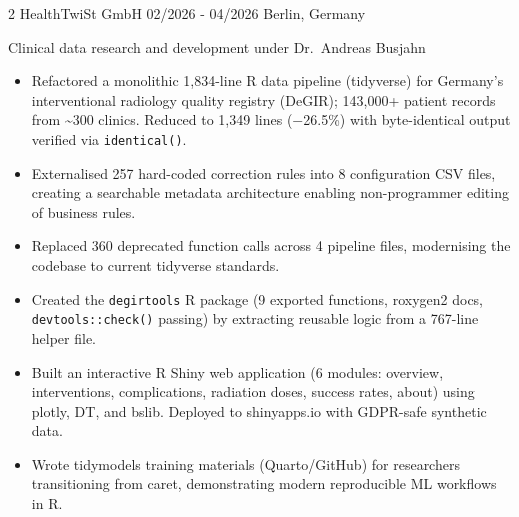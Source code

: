 \documentclass{thejus_cv}
\begin{document}
\begin{paracol}{2}
             {HealthTwiSt GmbH}
             {02/2026 - 04/2026}
             {Berlin, Germany}
             {Clinical data research and development under Dr.~Andreas Busjahn
             \begin{itemize}\setlength{\itemsep}{0.05em}
                   \item Refactored a monolithic 1,834-line R data pipeline (tidyverse) for Germany's interventional radiology quality registry (DeGIR); 143,000+ patient records from \textasciitilde300 clinics. Reduced to 1,349 lines ($-$26.5\%) with byte-identical output verified via \texttt{identical()}.
                   \item Externalised 257 hard-coded correction rules into 8 configuration CSV files, creating a searchable metadata architecture enabling non-programmer editing of business rules.
                   \item Replaced 360 deprecated function calls across 4 pipeline files, modernising the codebase to current tidyverse standards.
                   \item Created the \texttt{degirtools} R package (9 exported functions, roxygen2 docs, \texttt{devtools::check()} passing) by extracting reusable logic from a 767-line helper file.
                   \item Built an interactive R Shiny web application (6 modules: overview, interventions, complications, radiation doses, success rates, about) using plotly, DT, and bslib. Deployed to shinyapps.io with GDPR-safe synthetic data.
                   \item Wrote tidymodels training materials (Quarto/GitHub) for researchers transitioning from caret, demonstrating modern reproducible ML workflows in R.
               \end{itemize}}


\end{paracol}
\end{document}
